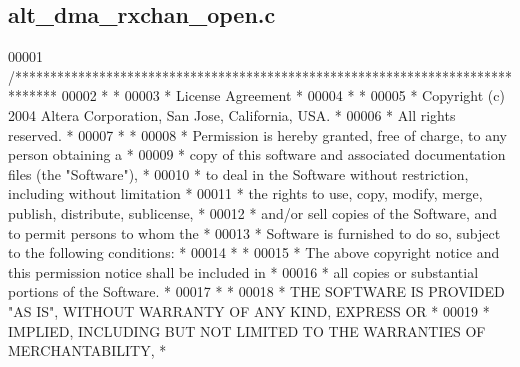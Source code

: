 \subsection{alt\+\_\+dma\+\_\+rxchan\+\_\+open.\+c}
\label{alt__dma__rxchan__open_8c_source}

\begin{DoxyCode}
00001 \textcolor{comment}{/******************************************************************************}
00002 \textcolor{comment}{*                                                                             *}
00003 \textcolor{comment}{* License Agreement                                                           *}
00004 \textcolor{comment}{*                                                                             *}
00005 \textcolor{comment}{* Copyright (c) 2004 Altera Corporation, San Jose, California, USA.           *}
00006 \textcolor{comment}{* All rights reserved.                                                        *}
00007 \textcolor{comment}{*                                                                             *}
00008 \textcolor{comment}{* Permission is hereby granted, free of charge, to any person obtaining a     *}
00009 \textcolor{comment}{* copy of this software and associated documentation files (the "Software"),  *}
00010 \textcolor{comment}{* to deal in the Software without restriction, including without limitation   *}
00011 \textcolor{comment}{* the rights to use, copy, modify, merge, publish, distribute, sublicense,    *}
00012 \textcolor{comment}{* and/or sell copies of the Software, and to permit persons to whom the       *}
00013 \textcolor{comment}{* Software is furnished to do so, subject to the following conditions:        *}
00014 \textcolor{comment}{*                                                                             *}
00015 \textcolor{comment}{* The above copyright notice and this permission notice shall be included in  *}
00016 \textcolor{comment}{* all copies or substantial portions of the Software.                         *}
00017 \textcolor{comment}{*                                                                             *}
00018 \textcolor{comment}{* THE SOFTWARE IS PROVIDED "AS IS", WITHOUT WARRANTY OF ANY KIND, EXPRESS OR  *}
00019 \textcolor{comment}{* IMPLIED, INCLUDING BUT NOT LIMITED TO THE WARRANTIES OF MERCHANTABILITY,    *}

\end{DoxyCode}
